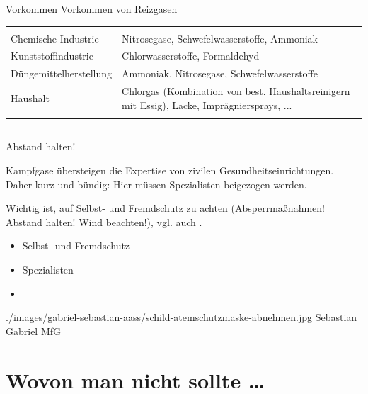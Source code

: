 \Table
{Vorkommen}%
{Vorkommen von Reizgasen}%
{}%
{}%
{}%
{%
\begin{tabulary}{\linewidth}{LL}\addlinespace\toprule\addlinespace
\noindent{} & \noindent{}
\\\addlinespace\midrule\addlinespace
Chemische Industrie 
&
Nitrosegase,  Schwefelwasserstoffe, Ammoniak
\\\addlinespace
Kunststoffindustrie 
&
Chlorwasserstoffe,  Formaldehyd
\\\addlinespace
Düngemittelherstellung 
&
Ammoniak,  Nitrosegase, Schwefelwasserstoffe
\\\addlinespace
Haushalt 
&
Chlorgas (Kombination von best.  Haushaltsreinigern mit
Essig), Lacke,  Imprägniersprays, ...
\\\addlinespace\bottomrule
\end{tabulary}
}%
{}%







\subsection{}

\TextSlideTeaser
{Abstand halten!}%
{%
\noindent Kampfgase übersteigen die Expertise von zivilen Gesundheitseinrichtungen. 
Daher kurz und bündig: Hier müssen Spezialisten beigezogen werden.

Wichtig ist, auf Selbst- und Fremdschutz zu achten 
(Absperrmaßnahmen! Abstand halten! Wind beachten!), vgl. auch
.}%
{
\begin{itemize}
  \item Selbst- und Fremdschutz
  \item Spezialisten
  \item {}
\end{itemize}}%
{./images/gabriel-sebastian-aass/schild-atemschutzmaske-abnehmen.jpg}%
{}%
{}%
{Sebastian Gabriel}%
{MfG}%


\clearpage
\section{Wovon man nicht  sollte 
\ldots}

